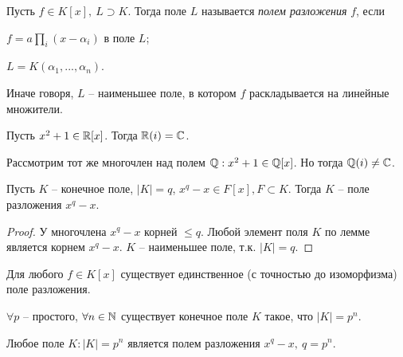 \begin{Def}
	Пусть $f \in K[x], \ L \supset K$. Тогда поле $L$ называется \textit{полем разложения} $f$, если  
	\begin{MyList}
		\item $f = a \prod_i (x - \alpha_i)$ в поле $L$;
		\item $L = K (\alpha_1, ..., \alpha_n)$.  
	\end{MyList}

	Иначе говоря, $L$ -- наименьшее поле, в котором $f$ раскладывается на линейные множители.
\end{Def}

\begin{Example}
	Пусть $x^2 + 1 \in \mathbb{R}[x]$. Тогда $\mathbb{R}(i) = \mathbb{C}$. 
\end{Example}

\begin{Example}
	Рассмотрим тот же многочлен над полем $\mathbb{Q} : x^2 + 1 \in \mathbb{Q}[x]$. Но тогда $\mathbb{Q}(i) \neq \mathbb{C}$.
\end{Example}

\begin{Lm}
	Пусть $K$ -- конечное поле, $|K| = q$, $x^q - x \in F[x], F \subset K$.
	Тогда $K$ -- поле разложения $x^q - x$.
\end{Lm}

\begin{proof}
	У многочлена $x^q - x$ корней $\leqslant q$. Любой элемент поля $K$ по лемме является корнем $x^q - x$.
	$K$ -- наименьшее поле, т.к. $|K| = q$.  
\end{proof}

\begin{Thm}
	Для любого $f \in K[x]$ существует единственное (с точностью до изоморфизма) поле разложения. 
\end{Thm}

\begin{Thm}
	\begin{MyList}
		\item $\forall p$ -- простого, $\forall n \in \mathbb{N}$ существует конечное поле $K$ такое, что $|K| = p^n$.
		\item Любое поле $K : |K| = p^n$ является полем разложения $x^q - x, \ q = p^n$.
	\end{MyList}  
\end{Thm}

